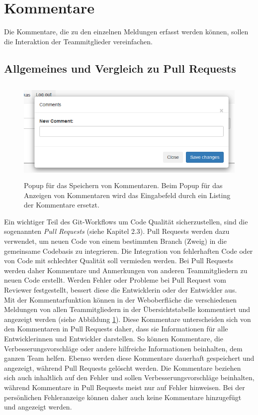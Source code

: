 \section{Kommentare}
Die Kommentare, die zu den einzelnen Meldungen erfasst werden können, sollen die Interaktion der Teammitglieder vereinfachen.
\subsection{Allgemeines und Vergleich zu Pull Requests}
\begin{figure}[tp]
  \centering
  \includegraphics[height=5cm]{images/popup.PNG}
 \caption[Popup für das Speichern von Kommentaren]{Popup für das Speichern von Kommentaren. Beim Popup für das Anzeigen von Kommentaren wird das Eingabefeld durch ein Listing der Kommentare ersetzt.}
  \label{fig:table}
\end{figure}
Ein wichtiger Teil des Git-Workflows um Code Qualität sicherzustellen, sind die sogenannten \textit{Pull Requests} (siehe Kapitel 2.3). Pull Requests werden dazu verwendet, um neuen Code von einem bestimmten Branch (Zweig) in die gemeinsame Codebasis zu integrieren. Die Integration von fehlerhaften Code oder von Code mit schlechter Qualität soll vermieden werden. Bei Pull Requests werden daher Kommentare und Anmerkungen von anderen Teammitgliedern zu neuen Code erstellt. Werden Fehler oder Probleme bei Pull Request vom Reviewer festgestellt, bessert diese die Entwicklerin oder der Entwickler aus. \\ Mit der Kommentarfunktion können in der Weboberfläche die verschiedenen Meldungen von allen Teammitgliedern in der Übersichtstabelle kommentiert und angezeigt werden (siehe Abbildung \ref{fig:table}). Diese Kommentare unterscheiden sich von den Kommentaren in Pull Requests daher, dass sie Informationen für alle Entwicklerinnen und Entwickler darstellen. So können Kommentare, die Verbesserungsvorschläge oder andere hilfreiche Informationen beinhalten, dem ganzen Team helfen. Ebenso werden diese Kommentare dauerhaft gespeichert und angezeigt, während Pull Requests gelöscht werden. Die Kommentare beziehen sich auch inhaltlich auf den Fehler und sollen Verbesserungsvorschläge beinhalten, während Kommentare in Pull Requests meist nur auf Fehler hinweisen. Bei der persönlichen Fehleranzeige können daher auch keine Kommentare hinzugefügt und angezeigt werden.
